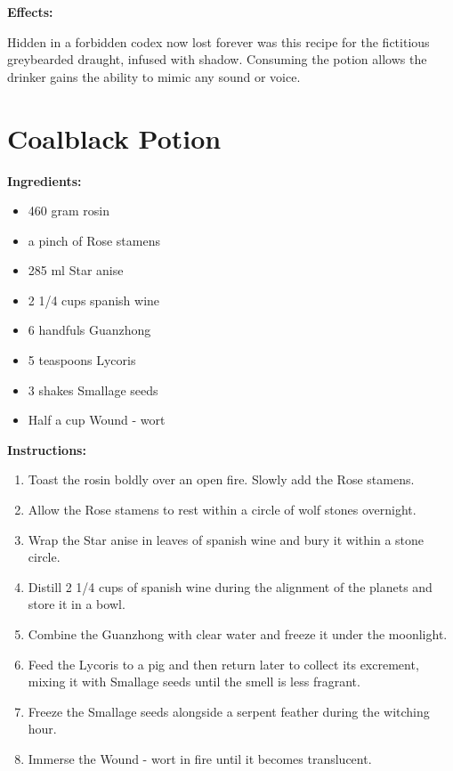 \documentclass{article}
\begin{document}
\textbf{Effects:}

Hidden in a forbidden codex now lost forever was this recipe for the fictitious greybearded draught, infused with shadow. Consuming the potion allows the drinker gains the ability to mimic any sound or voice.

\newpage
\section*{Coalblack Potion}

\textbf{Ingredients:}

\begin{itemize}
  \item 460 gram rosin
  \item a pinch of Rose stamens
  \item 285 ml Star anise
  \item 2 1/4 cups spanish wine
  \item 6 handfuls Guanzhong
  \item 5 teaspoons Lycoris
  \item 3 shakes Smallage seeds
  \item Half a cup Wound - wort
\end{itemize}

\textbf{Instructions:}

\begin{enumerate}
  \item Toast the rosin boldly over an open fire. Slowly add the Rose stamens.
  \item Allow the Rose stamens to rest within a circle of wolf stones overnight.
  \item Wrap the Star anise in leaves of spanish wine and bury it within a stone circle.
  \item Distill 2 1/4 cups of spanish wine during the alignment of the planets and store it in a bowl.
  \item Combine the Guanzhong with clear water and freeze it under the moonlight.
  \item Feed the Lycoris to a pig and then return later to collect its excrement, mixing it with Smallage seeds until the smell is less fragrant.
  \item Freeze the Smallage seeds alongside a serpent feather during the witching hour.
  \item Immerse the Wound - wort in fire until it becomes translucent.
\end{enumerate}
\end{document}
